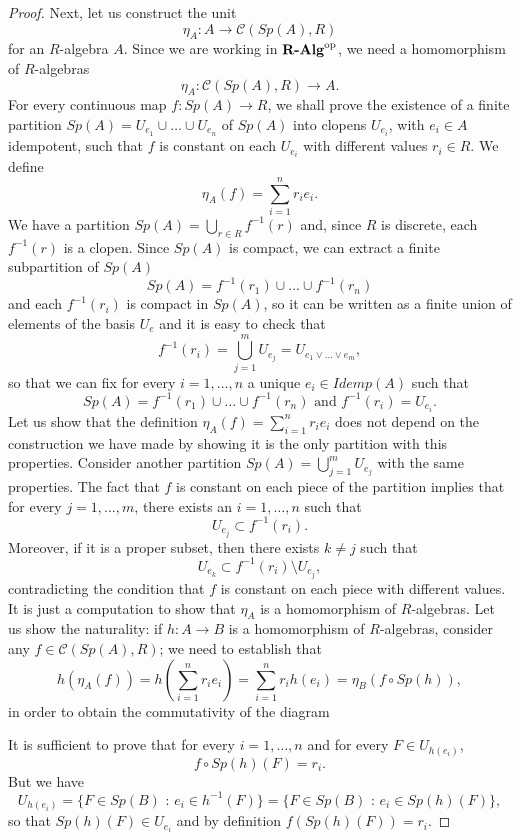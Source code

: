 \begin{proposition}
\begin{proof}
        Next, let us construct the unit
        \[ \eta_A:A\longrightarrow \mathcal{C}(Sp(A), R) \]
        for an $R$-algebra $A$. Since we are working in ${\textbf{R-Alg}}^{\mathrm{op}}$, we need a homomorphism of $R$-algebras
        \[ \eta_A:\mathcal{C}(Sp(A),R)\longrightarrow A. \]
        For every continuous map $f:Sp(A)\to R$, we shall prove the existence of a finite partition $Sp(A)=U_{e_1}\cup\dots\cup U_{e_n}$ of $Sp(A)$ into clopens $U_{e_i}$, with $e_i\in A$ idempotent, such that $f$ is constant on each $U_{e_i}$ with different values $r_i\in R$. We define
        \[\eta_A(f) = \sum_{i=1}^{n}r_ie_i.\] 
        We have a partition $Sp(A) = \bigcup_{r\in R}f^{-1}(r)$ and, since $R$ is discrete, each $f^{-1}(r)$ is a clopen. Since $Sp(A)$ is compact, we can extract a finite subpartition of $Sp(A)$
        \[ Sp(A) = f^{-1}(r_1)\cup\dots\cup f^{-1}(r_n) \]
        and each $f^{-1}(r_i)$ is compact in $Sp(A)$, so it can be written as a finite union of elements of the basis $U_e$ and it is easy to check that
        \[ f^{-1}(r_i) = \bigcup_{j=1}^mU_{e_j} = U_{e_1\vee\dots\vee e_m}, \]
        so that we can fix for every $i=1,\dots,n$ a unique $e_i\in Idemp(A)$ such that
        \[ Sp(A) = f^{-1}(r_1)\cup\dots\cup f^{-1}(r_n) \text{ and } f^{-1}(r_i) = U_{e_i}. \]
        Let us show that the definition $\eta_A(f) = \sum_{i=1}^{n}r_ie_i$ does not depend on the construction we have made by showing it is the only partition with this properties. Consider another partition $Sp(A) = \bigcup_{j=1}^{m}U_{e_j}$ with the same properties. The fact that $f$ is constant on each piece of the partition implies that for every $j=1,\dots, m$, there exists an $i=1,\dots, n$ such that
        \[ U_{e_j}\subset f^{-1}(r_i). \]
        Moreover, if it is a proper subset, then there exists $k\not=j$ such that 
        \[ U_{e_k}\subset f^{-1}(r_i)\setminus U_{e_j}, \]
        contradicting the condition that $f$ is constant on each piece with different values.
        It is just a computation to show that $\eta_A$ is a homomorphism of $R$-algebras. Let us show the naturality: if $h:A\to B$ is a homomorphism of $R$-algebras, consider any $f\in \mathcal{C}(Sp(A),R)$; we need to establish that \[ h(\eta_A(f)) = h(\sum_{i=1}^{n}r_ie_i) = \sum_{i=1}^{n}r_ih(e_i) = \eta_B(f\circ Sp(h)), \]
        in order to obtain the commutativity of the diagram
        \begin{center}
        \end{center}
        It is sufficient to prove that for every $i=1,\dots,n$ and for every $F\in U_{h(e_i)}$, 
        \[ f\circ Sp(h)(F) = r_i. \]
        But we have
        \[ U_{h(e_i)} = \{F\in Sp(B)\text{ : }e_i\in h^{-1}(F)\} = \{F\in Sp(B)\text{ : }e_i\in Sp(h)(F)\}, \]
        so that $Sp(h)(F)\in U_{e_i}$ and by definition $f(Sp(h)(F)) = r_i$.



\end{proof}
\end{proposition}
